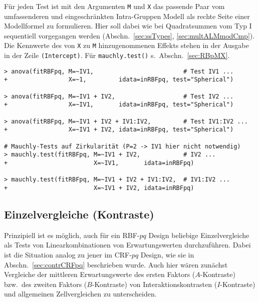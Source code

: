 Für jeden Test ist mit den Argumenten \lstinline!M! und \lstinline!X! das passende Paar vom umfassenderen und eingeschränkten Intra-Gruppen Modell als rechte Seite einer Modellformel zu formulieren. Hier soll dabei wie bei Quadratsummen vom Typ I sequentiell vorgegangen werden (Abschn.\ \ref{sec:ssTypes}, \ref{sec:multALMmodCmp}). Die Kennwerte des von \lstinline!X! zu \lstinline!M! hinzugenommenen Effekts stehen in der Ausgabe in der Zeile \lstinline!(Intercept)!. Für \lstinline!mauchly.test()! s.\ Abschn.\ \ref{sec:RBpMX}.
\begin{lstlisting}
> anova(fitRBFpq, M=~IV1,                         # Test IV1 ...
+                 X=~1,         idata=inRBFpq, test="Spherical")

> anova(fitRBFpq, M=~IV1 + IV2,                   # Test IV2 ...
+                 X=~IV1,       idata=inRBFpq, test="Spherical")

> anova(fitRBFpq, M=~IV1 + IV2 + IV1:IV2,         # Test IV1:IV2 ...
+                 X=~IV1 + IV2, idata=inRBFpq, test="Spherical")

# Mauchly-Tests auf Zirkularität (P=2 -> IV1 hier nicht notwendig)
> mauchly.test(fitRBFpq, M=~IV1 + IV2,            # IV2 ...
+                        X=~IV1,       idata=inRBFpq)

> mauchly.test(fitRBFpq, M=~IV1 + IV2 + IV1:IV2,  # IV1:IV2 ...
+                        X=~IV1 + IV2, idata=inRBFpq)
\end{lstlisting}

\subsection{Einzelvergleiche (Kontraste)}

Prinzipiell ist es möglich, auch für ein RBF-$pq$ Design beliebige Einzelvergleiche als Tests von Linearkombinationen von Erwartungswerten durchzuführen. Dabei ist die Situation analog zu jener im CRF-$pq$ Design, wie sie in Abschn.\ \ref{sec:contrCRFpq} beschrieben wurde. Auch hier wären zunächst Vergleiche der mittleren Erwartungswerte des ersten Faktors ($A$-Kontraste) bzw.\ des zweiten Faktors ($B$-Kontraste) von Interaktionskontrasten ($I$-Kontraste) und allgemeinen Zellvergleichen zu unterscheiden.

